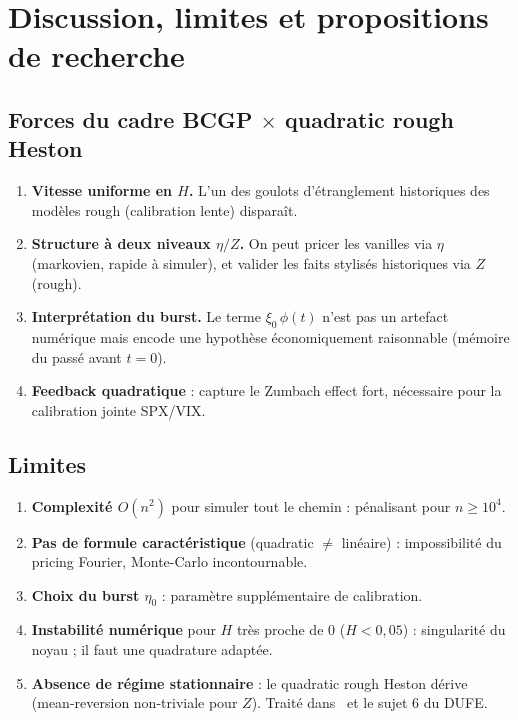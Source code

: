 \documentclass[11pt,a4paper]{article}
\theoremstyle{definition}
\newcommand{\1}{\mathbf{1}}
\begin{document}
\section{Discussion, limites et propositions de recherche}
\label{sec:discussion}

\subsection{Forces du cadre BCGP $\times$ quadratic rough Heston}
\begin{enumerate}[leftmargin=*,topsep=1pt,itemsep=2pt]
\item \textbf{Vitesse uniforme en $H$.} L'un des goulots d'étranglement
      historiques des modèles rough (calibration lente) disparaît.
\item \textbf{Structure à deux niveaux $\eta/Z$.} On peut pricer les vanilles via
      $\eta$ (markovien, rapide à simuler), et valider les faits stylisés
      historiques via $Z$ (rough).
\item \textbf{Interprétation du burst.} Le terme $\xi_0\,\phi(t)$ n'est pas un
      artefact numérique mais encode une hypothèse économiquement raisonnable
      (mémoire du passé avant $t=0$).
\item \textbf{Feedback quadratique} : capture le Zumbach effect fort, nécessaire
      pour la calibration jointe SPX/VIX.
\end{enumerate}

\subsection{Limites}
\begin{enumerate}[leftmargin=*,topsep=1pt,itemsep=2pt]
\item \textbf{Complexité $O(n^2)$} pour simuler tout le chemin : pénalisant
      pour $n\geq 10^4$.
\item \textbf{Pas de formule caractéristique} (quadratic $\neq$ linéaire) :
      impossibilité du pricing Fourier, Monte-Carlo incontournable.
\item \textbf{Choix du burst $\eta_0$} : paramètre supplémentaire de calibration.
\item \textbf{Instabilité numérique} pour $H$ très proche de 0 ($H<0{,}05$) :
      singularité du noyau ; il faut une quadrature adaptée.
\item \textbf{Absence de régime stationnaire} : le quadratic rough Heston
      dérive (mean-reversion non-triviale pour $Z$). Traité dans~\cite{P24}
      et le sujet 6 du DUFE.
\end{enumerate}
\end{document}
